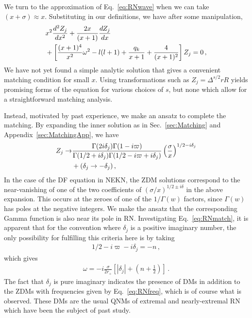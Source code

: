 \begin{refsection}
We turn to the approximation of Eq.~\eqref{eq:RNwave} when we can take $(x + \sigma) \approx x$. 
Substituting in our definitions, we have after some manipulation,
\begin{align}
&x^2 \frac{d^2 Z_j}{dx^2} + \frac{2x}{(x+1)} \frac{d Z_j}{dx} \notag \\ & + \left[\frac{(x+1)^4}{x^2}  \omega^2 - l(l+1) + \frac{q_k}{x+1} + \frac{4}{(x+1)^2}\right] Z_j  = 0 \,,
\end{align}
We have not yet found a simple analytic solution that gives a convenient matching condition for small $x$. Using transformations such as $Z_j = \Delta^{s/2} r R$ yields promising forms of the equation for various choices of $s$, but none which allow for a straightforward matching analysis. 

Instead, motivated by past experience, we make an ansatz to complete the matching. By expanding the inner solution as in Sec.~\ref{sec:Matching} and Appendix~\ref{sec:MatchingApp}, we have
\begin{align}
\label{eq:RNmatch}
Z_j \to &\frac{\Gamma(2 i \delta_j) \Gamma(1-i \varpi)}{\Gamma(1/2 + i \delta_j)\Gamma(1/2 - i \varpi + i \delta_j)} \left( \frac{\sigma}{x} \right)^{1/2-i\delta_j}\notag \\
&+ (\delta_j \to - \delta_j) \,,
\end{align}
In the case of the DF equation in NEKN, the ZDM solutions correspond to the near-vanishing of one of the two coefficients of $(\sigma/x)^{1/2 \pm i \delta}$ in the above expansion. This occurs at the zeroes of one of the $1/\Gamma(w)$ factors, since $\Gamma(w)$ has poles at the negative integers. We make the ansatz that the corresponding Gamma function is also near its pole in RN. Investigating Eq.~\eqref{eq:RNmatch}, it is apparent that for the convention where $\delta_j$ is a positive imaginary number, the only possibility for fulfilling this criteria here is by taking 
\begin{align}
\label{eq:RNprematch}
1/2 - i \varpi - i \delta_j = - n \,,
\end{align}
which gives 
\begin{align}
\label{eq:RNfreq}
\omega = -i \frac{\sigma}{2r_+} \left[ |\delta_j| + \left(n + \frac 12 \right)\right] \,.
\end{align}
The fact that $\delta_j$ is pure imaginary indicates the presence of DMs in addition to the ZDMs with frequencies given by Eq.~\eqref{eq:RNfreq}, which is of course what is observed. 
These DMs are the usual QNMs of extremal and nearly-extremal RN which have been the subject of past study.


\end{refsection}
